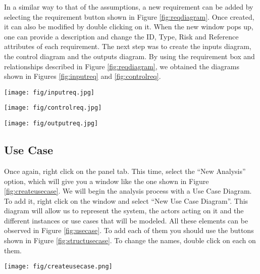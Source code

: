 \documentclass[12pt]{article}
\begin{document}
In a similar way to that of the assumptions, a new requirement can be added by selecting the requirement button shown in Figure \ref{fig:reqdiagram}. Once created, it can also be modified by double clicking on it. When the new window pops up, one can provide a description and change the ID, Type, Risk and Reference attributes of each requirement.
	The next step was to create the inputs diagram, the control diagram and the outputs diagram. By using the requirement box and relationships described in Figure \ref{fig:reqdiagram}, we obtained the diagrams shown in Figures \ref{fig:inputreq} and \ref{fig:controlreq}. 

\begin{figure*}[htbp]
\centering
\texttt{[image: fig/inputreq.jpg]}
\caption{Inputs requirements diagram} \label{fig:inputreq}
\end{figure*}

\begin{figure*}[htbp]
\centering
\texttt{[image: fig/controlreq.jpg]}
\caption{Control requirements diagram} \label{fig:controlreq}
\end{figure*}

\begin{figure*}[htbp]
\centering
\texttt{[image: fig/outputreq.jpg]}
\caption{Output requirements diagram} \label{fig:outputreq}
\end{figure*}

\subsection{Use Case}
	Once again, right click on the panel tab. This time, select the “New Analysis” option, which will give you a window like the one shown in Figure \ref{fig:createusecase}. We will begin the analysis process with a Use Case Diagram. To add it, right click on the window and select “New Use Case Diagram”. This diagram will allow us to represent the system, the actors acting on it and the different instances or use cases that will be modeled. All these elements can be observed in Figure \ref{fig:usecase}. To add each of them you should use the buttons shown in Figure \ref{fig:structusecase}. To change the names, double click on each on them.
	
\begin{figure*}[htbp]
\centering
\texttt{[image: fig/createusecase.png]}
\caption{Create Use Case Diagram} \label{fig:createusecase}
\end{figure*}
\end{document}
